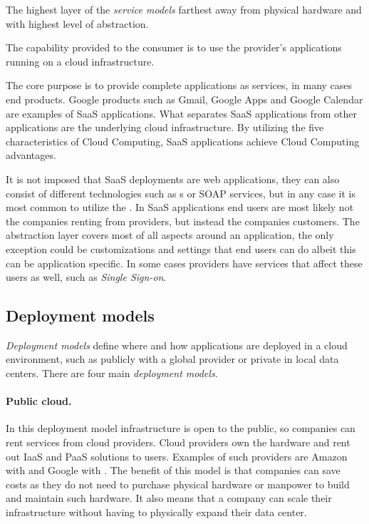 The highest layer of the \emph{service models} farthest away from physical hardware
and with highest level of abstraction.
\epigraph{The capability provided to the consumer is to use the provider's 
  applications running on a cloud infrastructure.
}{\citet{nist:mell11}}

The core purpose is to provide complete applications as services, in many cases end products.
Google products such as Gmail, Google Apps and  Google Calendar are examples of 
SaaS applications.
What separates SaaS applications from other applications are the underlying cloud infrastructure.
By utilizing the five characteristics of Cloud Computing,
SaaS applications achieve Cloud Computing advantages.

It is not imposed that SaaS deployments are web applications, they can also consist of
different technologies such as  s or SOAP services, but in any case it is 
most common to utilize the .
In SaaS applications end users are most likely not the companies renting from providers, 
but instead the companies customers.
The abstraction layer covers most of all aspects around an application,
the only exception could be customizations and settings that end users can do albeit 
this can be application specific. In some cases providers have services that affect
these users as well, such as \emph{Single Sign-on}.

\subsection{Deployment models}

\emph{Deployment models} define where and how applications are deployed in a cloud environment,
such as publicly with a global provider or private in local data centers.
There are four main \emph{deployment models}.

\paragraph{Public cloud.}

In this deployment model infrastructure is open to the public,
so companies can rent services from cloud providers.
Cloud providers own the hardware and rent out IaaS and PaaS solutions to users.
Examples of such providers are Amazon with  and Google with .
The benefit of this model is that companies can save costs as 
they do not need to purchase physical hardware or manpower to build and maintain such hardware.
It also means that a company can scale their infrastructure without having to
physically expand their data center.

